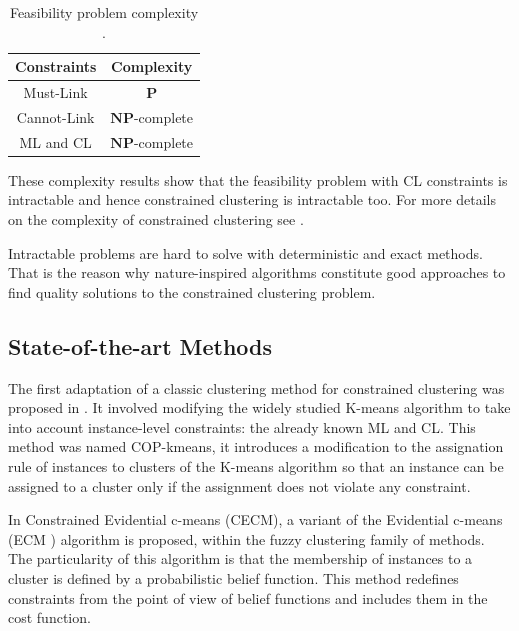 \documentclass[review]{elsarticle}
\begin{document}
\begin{table}[!h]
	\centering
	\setlength{\tabcolsep}{7pt}
	\renewcommand{\arraystretch}{1.2}
		\begin{tabular}{c c}
			\hline
			Constraints & Complexity \\
			\hline
			Must-Link & $\mathbf{P}$\\
			Cannot-Link & $\mathbf{NP}$-complete\\
			ML and CL & $\mathbf{NP}$-complete\\
			\hline

		\end{tabular}%
	\caption{Feasibility problem complexity \cite{davidson2005clustering}.}
	\label{tab:feasibility}
\end{table}

These complexity results show that the feasibility problem with CL constraints is intractable and hence constrained clustering is intractable too. For more details on the complexity of constrained clustering see \cite{davidson2005clustering}.

Intractable problems are hard to solve with deterministic and exact methods. That is the reason why nature-inspired algorithms constitute good approaches to find quality solutions to the constrained clustering problem.

\subsection{State-of-the-art Methods} \label{sec:BackSOTA}

The first adaptation of a classic clustering method for constrained clustering was proposed in \cite{wagstaff2001constrained}. It involved modifying the widely studied K-means algorithm to take into account instance-level constraints: the already known ML and CL. This method was named COP-kmeans, it introduces a modification to the assignation rule of instances to clusters of the K-means algorithm so that an instance can be assigned to a cluster only if the assignment does not violate any constraint.

In \cite{antoine2012cecm} Constrained Evidential c-means (CECM), a variant of the Evidential c-means (ECM \cite{masson2008ecm}) algorithm is proposed, within the fuzzy clustering family of methods. The particularity of this algorithm is that the membership of instances to a cluster is defined by a probabilistic belief function. This method redefines constraints from the point of view of belief functions and includes them in the cost function.
\end{document}
